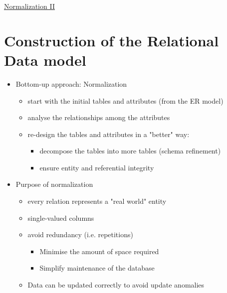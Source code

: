 \documentclass{article}[18pt]
\begin{document}
\begin{center}
\underline{\huge Normalization II}
\end{center}
\section{Construction of the Relational Data model}
\begin{itemize}
	\item Bottom-up approach: Normalization
	\begin{itemize}
		\item start with the initial tables and attributes (from the ER model)
		\item analyse the relationships among the attributes
		\item re-design the tables and attributes in a "better" way:
		\begin{itemize}
			\item decompose the tables into more tables (schema refinement)
			\item ensure entity and referential integrity
		\end{itemize}
	\end{itemize}
	\item Purpose of normalization
	\begin{itemize}
		\item every relation represents a "real world" entity
		\item single-valued columns
		\item avoid redundancy (i.e. repetitions)
		\begin{itemize}
			\item Minimise the amount of space required
			\item Simplify maintenance of the database
		\end{itemize}
		\item Data can be updated correctly to avoid update anomalies
	\end{itemize}
\end{itemize}
\end{document}

